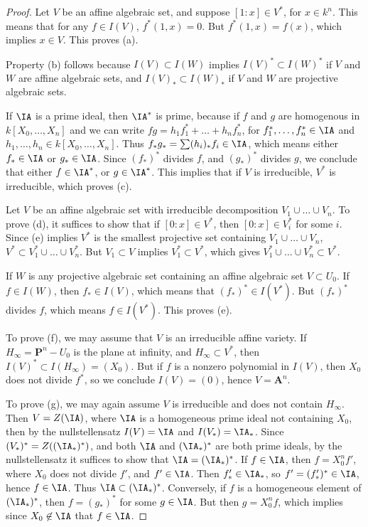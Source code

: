 \begin{proof}
    Let $V$ be an affine algebraic set, and suppose $[1:x] \in V^*$, for $x \in k^n$. This means that for any $f \in I(V)$, $f^*(1,x) = 0$. But $f^*(1,x) = f(x)$, which implies $x \in V$. This proves (a).

    Property (b) follows because $I(V) \subset I(W)$ implies $I(V)^* \subset I(W)^*$ if $V$ and $W$ are affine algebraic sets, and $I(V)_* \subset I(W)_*$ if $V$ and $W$ are projective algebraic sets.

    If $\IA$ is a prime ideal, then $\IA^*$ is prime, because if $f$ and $g$ are homogenous in $k[X_0,\dots,X_n]$ and we can write $fg = h_1f_1^* + \dots + h_nf_n^*$, for $f_1^*,\dots,f_n^* \in \IA$ and $h_1,\dots,h_n \in k[X_0,\dots,X_n]$. Thus $f_* g_* = \sum (h_i)_* f_i \in \IA$, which means either $f_* \in \IA$ or $g_* \in \IA$. Since $(f_*)^*$ divides $f$, and $(g_*)^*$ divides $g$, we conclude that either $f \in \IA^*$, or $g \in \IA^*$. This implies that if $V$ is irreducible, $V^*$ is irreducible, which proves (c).

    Let $V$ be an affine algebraic set with irreducible decomposition $V_1 \cup \dots \cup V_n$. To prove (d), it suffices to show that if $[0:x] \in V^*$, then $[0:x] \in V_i^*$ for some $i$. Since (e) implies $V^*$ is the smallest projective set containing $V_1 \cup \dots \cup V_n$, $V^* \subset V_1^* \cup \dots \cup V_n^*$. But $V_1 \subset V$ implies $V_1^* \subset V^*$, which gives $V_1^* \cup \dots \cup V_n^* \subset V^*$.

    If $W$ is any projective algebraic set containing an affine algebraic set $V \subset U_0$. If $f \in I(W)$, then $f_* \in I(V)$, which means that $(f_*)^* \in I(V^*)$. But $(f_*)^*$ divides $f$, which means $f \in I(V^*)$. This proves (e).

    To prove (f), we may assume that $V$ is an irreducible affine variety. If $H_\infty = \mathbf{P}^n - U_0$ is the plane at infinity, and $H_\infty \subset V^*$, then $I(V)^* \subset I(H_\infty) = (X_0)$. But if $f$ is a nonzero polynomial in $I(V)$, then $X_0$ does not divide $f^*$, so we conclude $I(V) = (0)$, hence $V = \mathbf{A}^n$.

    To prove (g), we may again assume $V$ is irreducible and does not contain $H_\infty$. Then $V = Z(\IA)$, where $\IA$ is a homogeneous prime ideal not containing $X_0$, then by the nullstellensatz $I(V) = \IA$ and $I(V_*) = \IA_*$. Since $(V_*)^* = Z((\IA_*)^*)$, and both $\IA$ and $(\IA_*)^*$ are both prime ideals, by the nullstellensatz it suffices to show that $\IA = (\IA_*)^*$. If $f \in \IA$, then $f = X_0^n f'$, where $X_0$ does not divide $f'$, and $f' \in \IA$. Then $f'_* \in \IA_*$, so $f' = (f'_*)^* \in \IA$, hence $f \in \IA$. Thus $\IA \subset (\IA_*)^*$. Conversely, if $f$ is a homogeneous element of $(\IA_*)^*$, then $f = (g_*)^*$ for some $g \in \IA$. But then $g = X_0^n f$, which implies since $X_0 \not \in \IA$ that $f \in \IA$.
\end{proof}

